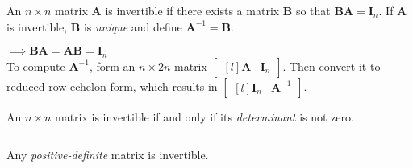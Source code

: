 \begin{theorem}
An $n\times n$ matrix $\bm{A}$ is invertible if there exists a matrix $\bm{B}$ so that $\bm{BA}=\bm{I}_n$. If $\bm{A}$ is invertible, $\bm{B}$ is \emph{unique} and define $\bm{A}^{-1}=\bm{B}$.
\end{theorem}
$\implies \bm{BA}=\bm{AB}=\bm{I}_n$\\

To compute $\bm{A}^{-1}$, form an $n\times 2n$ matrix $\begin{bmatrix*}[l]
       \bm{A} & \bm{I}_n\end{bmatrix*}$.
Then convert it to reduced row echelon form, which results in $\begin{bmatrix*}[l]
       \bm{I}_n & \bm{A}^{-1}\end{bmatrix*}$.

\begin{theorem}
An $n\times n$ matrix is invertible if and only if its \emph{determinant} is not zero.
\end{theorem}

\begin{theorem}$\ $\vspace{-0.1in}
\begin{center}Any \emph{positive-definite} matrix is invertible.\end{center}
\end{theorem}


